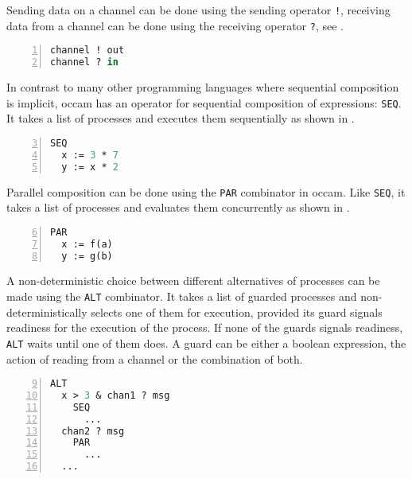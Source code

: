 Sending data on a channel can be done using the sending operator \texttt{!}, receiving data from a channel can be done using the receiving operator \texttt{?}, see .

\begin{lstlisting}[language=Caml, caption=Sending data over a channel and receiving data from a channel in \textsf{occam}., label=lst:occam_send_receive, numbers=left, frame=bt]
channel ! out
channel ? in
\end{lstlisting}

In contrast to many other programming languages where sequential composition is implicit, \textsf{occam} has an operator for sequential composition of expressions: \texttt{SEQ}. It takes a list of processes and executes them sequentially as shown in .

\begin{lstlisting}[language=Caml, caption=Sequential composition of processes in \textsf{occam}., label=lst:occam_seq, numbers=left, frame=bt, firstnumber=3]
SEQ
  x := 3 * 7
  y := x * 2
\end{lstlisting}

Parallel composition can be done using the \texttt{PAR} combinator in \textsf{occam}. Like \texttt{SEQ}, it takes a list of processes and evaluates them concurrently as shown in .

\begin{lstlisting}[language=Caml, caption=Parallel composition of processes in \textsf{occam}., label=lst:occam_par, numbers=left, frame=bt, firstnumber=6]
PAR
  x := f(a)
  y := g(b)
\end{lstlisting}

A non-deterministic choice between different alternatives of processes can be made using the \texttt{ALT} combinator. It takes a list of guarded processes and non-deterministically selects one of them for execution, provided its guard signals readiness for the execution of the process. If none of the guards signals readiness, \texttt{ALT} waits until one of them does. A guard can be either a boolean expression, the action of reading from a channel or the combination of both.

\begin{lstlisting}[language=Caml, caption=Choice between process alternatives in \textsf{occam}., label=lst:occam_par, numbers=left, frame=bt, firstnumber=9]
ALT
  x > 3 & chan1 ? msg
    SEQ
      ...
  chan2 ? msg
    PAR
      ...
  ...
\end{lstlisting}

